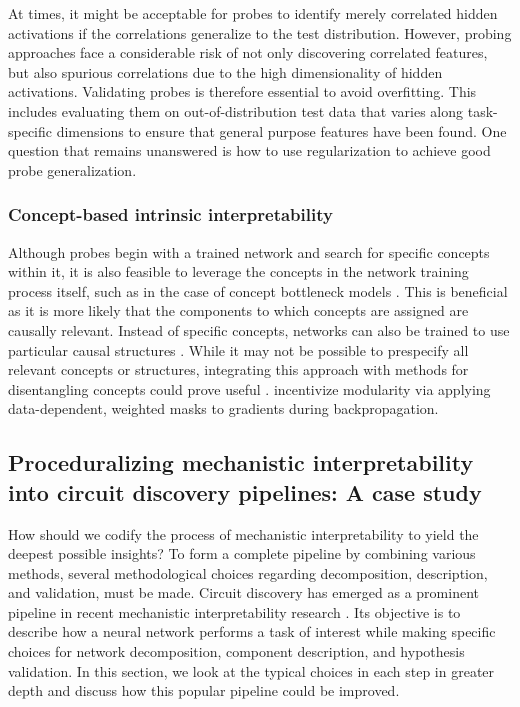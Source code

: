At times, it might be acceptable for probes to identify merely correlated hidden activations if the correlations generalize to the test distribution. However, probing approaches face a considerable risk of not only discovering correlated features, but also spurious correlations due to the high dimensionality of hidden activations. Validating probes is therefore essential to avoid overfitting. This includes evaluating them on out-of-distribution test data that varies along task-specific dimensions to ensure that general purpose features have been found. One question that remains unanswered is how to use regularization to achieve good probe generalization.

\subsubsection{Concept-based intrinsic interpretability}
\label{subsubsec:concept-based-intrinsic-interpretability}

Although probes begin with a trained network and search for specific concepts within it, it is also feasible to leverage the concepts in the network training process itself, such as in the case of concept bottleneck models \citep{Koh_2020_ConceptBottleneckModels}. This is beneficial as it is more likely that the components to which concepts are assigned are causally relevant. Instead of specific concepts, networks can also be trained to use particular causal structures \citep{Geiger_2022_CausalStructure}. While it may not be possible to prespecify all relevant concepts or structures, integrating this approach with methods for disentangling concepts could prove useful \citep{chen2019isolatingsourcesdisentanglementvariational}. \citet{cloud2024gradientroutingmaskinggradients} incentivize modularity via applying data-dependent, weighted masks to gradients during backpropagation.

\subsection{Proceduralizing mechanistic interpretability into circuit discovery pipelines: A case study}
\label{subsec:proceduralizing}

How should we codify the process of mechanistic interpretability to yield the deepest possible insights? To form a complete pipeline by combining various methods, several methodological choices regarding decomposition, description, and validation, must be made. Circuit discovery has emerged as a prominent pipeline in recent mechanistic interpretability research \citep{Wang_2022_Circuits, hanna2023doesgpt2computegreaterthan, heimersheim2023circuit}. Its objective is to describe how a neural network performs a task of interest while making specific choices for network decomposition, component description, and hypothesis validation. In this section, we look at the typical choices in each step in greater depth and discuss how this popular pipeline could be improved.

